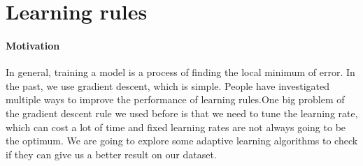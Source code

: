 \documentclass{article}
\begin{document}
 
%
%


\section{Learning rules}
\paragraph{Motivation} 
In general, training a model is a process of finding the local minimum of error. In the past, we use gradient descent, which is simple. People have investigated multiple ways to improve the performance of learning rules.One big problem of the gradient descent  rule we used before is that we need to tune the learning rate, which can cost a lot of time and fixed learning rates are not always going to be the optimum. We are going to explore some adaptive learning algorithms to check if they can give us a better result on our dataset.
\end{document}

